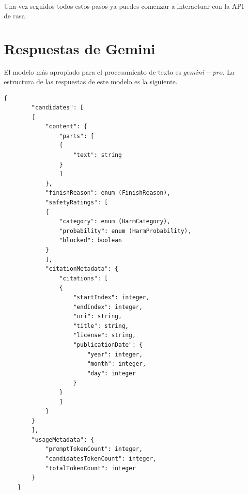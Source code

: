 Una vez seguidos todos estos pasos ya puedes comenzar a interactuar con la API de rasa. 


\section{Respuestas de Gemini}

El modelo más apropiado para el procesamiento de texto es $gemini-pro$. La estructura de las respuestas de este modelo es la siguiente. 

\begin{lstlisting}[style=SpyderStyle, caption={Estructura de una respuesta de Gemini}, captionpos=b, label={lst:python},breaklines = true]
	{
		"candidates": [
		{
			"content": {
				"parts": [
				{
					"text": string
				}
				]
			},
			"finishReason": enum (FinishReason),
			"safetyRatings": [
			{
				"category": enum (HarmCategory),
				"probability": enum (HarmProbability),
				"blocked": boolean
			}
			],
			"citationMetadata": {
				"citations": [
				{
					"startIndex": integer,
					"endIndex": integer,
					"uri": string,
					"title": string,
					"license": string,
					"publicationDate": {
						"year": integer,
						"month": integer,
						"day": integer
					}
				}
				]
			}
		}
		],
		"usageMetadata": {
			"promptTokenCount": integer,
			"candidatesTokenCount": integer,
			"totalTokenCount": integer
		}
	}
\end{lstlisting}

